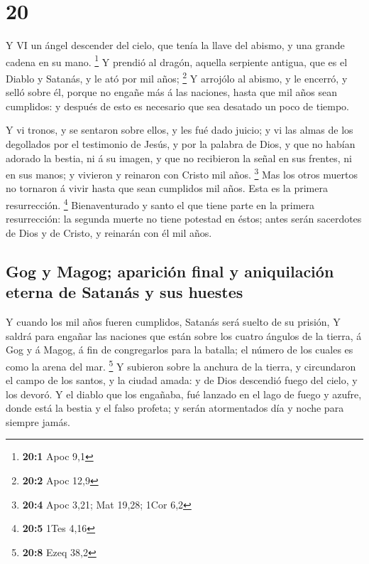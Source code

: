 \hypertarget{section-19}{%
\section{20}\label{section-19}}

 Y VI un ángel descender del cielo, que tenía la llave del
abismo, y una grande cadena en su mano. \footnote{\textbf{20:1} Apoc 9,1}
 Y prendió al dragón, aquella serpiente antigua, que es el
Diablo y Satanás, y le ató por mil años; \footnote{\textbf{20:2} Apoc
  12,9}  Y arrojólo al abismo, y le encerró, y selló sobre
él, porque no engañe más á las naciones, hasta que mil años sean
cumplidos: y después de esto es necesario que sea desatado un poco de
tiempo.

 Y vi tronos, y se sentaron sobre ellos, y les fué dado
juicio; y vi las almas de los degollados por el testimonio de Jesús, y
por la palabra de Dios, y que no habían adorado la bestia, ni á su
imagen, y que no recibieron la señal en sus frentes, ni en sus manos; y
vivieron y reinaron con Cristo mil años. \footnote{\textbf{20:4} Apoc
  3,21; Mat 19,28; 1Cor 6,2}  Mas los otros muertos no
tornaron á vivir hasta que sean cumplidos mil años. Esta es la primera
resurrección. \footnote{\textbf{20:5} 1Tes 4,16} 
Bienaventurado y santo el que tiene parte en la primera resurrección: la
segunda muerte no tiene potestad en éstos; antes serán sacerdotes de
Dios y de Cristo, y reinarán con él mil años.

\hypertarget{gog-y-magog-apariciuxf3n-final-y-aniquilaciuxf3n-eterna-de-satanuxe1s-y-sus-huestes}{%
\subsection{Gog y Magog; aparición final y aniquilación eterna de
Satanás y sus
huestes}\label{gog-y-magog-apariciuxf3n-final-y-aniquilaciuxf3n-eterna-de-satanuxe1s-y-sus-huestes}}

 Y cuando los mil años fueren cumplidos, Satanás será suelto
de su prisión,  Y saldrá para engañar las naciones que están
sobre los cuatro ángulos de la tierra, á Gog y á Magog, á fin de
congregarlos para la batalla; el número de los cuales es como la arena
del mar. \footnote{\textbf{20:8} Ezeq 38,2}  Y subieron
sobre la anchura de la tierra, y circundaron el campo de los santos, y
la ciudad amada: y de Dios descendió fuego del cielo, y los devoró.
 Y el diablo que los engañaba, fué lanzado en el lago de
fuego y azufre, donde está la bestia y el falso profeta; y serán
atormentados día y noche para siempre jamás.

